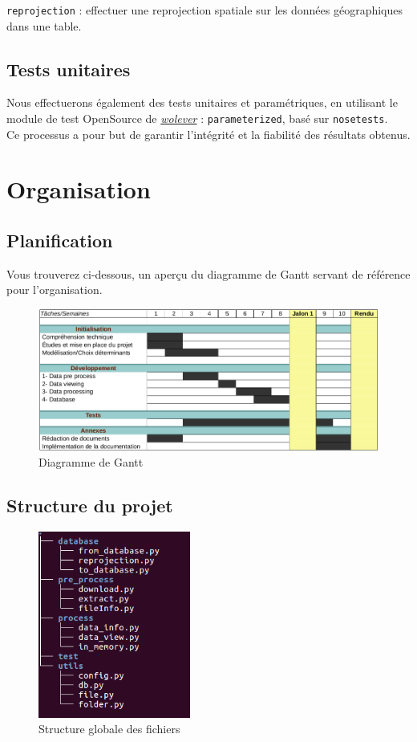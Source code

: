 \documentclass[french,12pt]{report}
\begin{document}
\begin{normalsize}
     \texttt{reprojection} : effectuer une reprojection spatiale sur les données géographiques dans une table.\\
   \section{Tests unitaires}
   Nous effectuerons également des tests unitaires et paramétriques, en utilisant le module de test OpenSource de \href{https://github.com/wolever/parameterized}{\textit{wolever}} : \texttt{parameterized}, basé sur \texttt{nosetests}.\\
   
   \noindent Ce processus a pour but de garantir l'intégrité et la fiabilité des résultats obtenus.
   \chapter{Organisation}
   \section{Planification}
   Vous trouverez ci-dessous, un aperçu du diagramme de Gantt servant de référence pour l'organisation.

   
   \begin{figure}[!h]
	\centerline{\includegraphics[width=15cm]{gantt_def.png}}
	\caption{Diagramme de Gantt}
   \end{figure}
      

  \section{Structure du projet}
\begin{figure}[h]
	\centerline{\includegraphics[width=5cm]{tree.png}}
	\caption{Structure globale des fichiers}
 \end{figure}     
\FloatBarrier



\end{normalsize}
\end{document}
